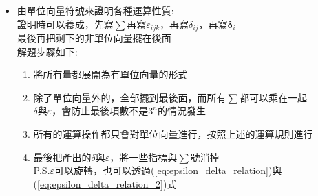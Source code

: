 \documentclass[../main.tex]{subfiles}
\begin{document}
\begin{itemize}
\begin{itemize}
        \begin{align}
          \overline{\overline {\bm \tau}} \times \vec {\bm v} &=
          \left(
            \sum_{i=1}^3 \sum_{j=1}^3 \bm \delta_i \bm \delta_j \tau_{ij}
          \right) \times
          \left(
            \sum_{k=1}^3 \bm \delta_k v_k
          \right) \nonumber\\
          &= \sum_{i=1}^3 \sum_{j=1}^3 \sum_{k=1}^3 \left(
            \bm \delta_i \bm \delta_j \times \bm \delta_k
          \right) \tau_{ij} v_k \nonumber\\
          &= \sum_{i=1}^3 \sum_{j=1}^3 \sum_{k=1}^3 \bm \delta_i (\bm \delta_j \times \bm \delta_k)  \tau_{ij} v_k \nonumber\\
          &= \sum_{i=1}^3 \sum_{j=1}^3 \sum_{k=1}^3 \bm \delta_i \varepsilon_{jkl} \bm \delta_l  \tau_{ij} v_k \nonumber\\
          &= \sum_{i=1}^3 \sum_{j=1}^3 \sum_{k=1}^3  \sum_{l=1}^3\bm \delta_i  \bm \delta_l  \varepsilon_{jkl}  \tau_{ij} v_k \label{eq:tensor_cross_vector}
        \end{align}
        一樣可以將$\bm \delta_i$和$\bm \delta_l$往前移
        \begin{align}
          \overline{\overline {\bm \tau}} \times \vec {\bm v} &=
          \sum_{i=1}^3 \sum_{l=1}^3 \bm \delta_i  \bm \delta_l \left(
            \sum_{j=1}^3 \sum_{k=1}^3 \varepsilon_{jkl}  \tau_{ij} v_k 
          \right)
        \end{align}
    \end{itemize}
  \item 由單位向量符號來證明各種運算性質:\\
  證明時可以養成，先寫$\sum$再寫$\varepsilon_{ijk}$，再寫$\delta_{ij}$，再寫$\bm \delta_{i}$\\
  最後再把剩下的非單位向量擺在後面\\
  解題步驟如下:
  \begin{enumerate}
    \item 將所有量都展開為有單位向量的形式
    \item 除了單位向量外的，全部擺到最後面，而所有$\sum$都可以乘在一起\\
    $\delta$與$\varepsilon$，會防止最後項數不是$3^n$的情況發生
    \item 所有的運算操作都只會對單位向量進行，按照上述的運算規則進行
    \item 最後把產出的$\delta$與$\varepsilon$，將一些指標與$\sum$號消掉\\
    P.S.$\varepsilon$可以旋轉，也可以透過(\ref{eq:epsilon_delta_relation})與(\ref{eq:epsilon_delta_relation_2})式\\

\end{enumerate}
\end{itemize}
\end{document}
